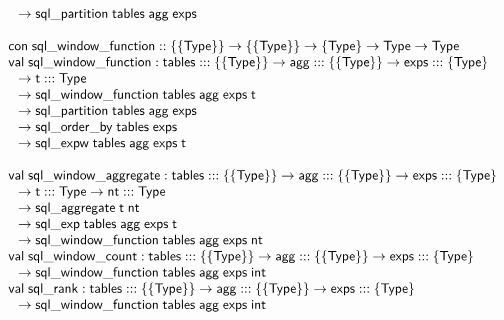 \documentclass{article}
\newcommand{\mt}[1]{\mathsf{#1}}
\begin{document}
$$\begin{array}{l}
  \hspace{.1in} \to \mt{sql\_partition} \; \mt{tables} \; \mt{agg} \; \mt{exps} \\
  \\
  \mt{con} \; \mt{sql\_window\_function} :: \{\{\mt{Type}\}\} \to \{\{\mt{Type}\}\} \to \{\mt{Type}\} \to \mt{Type} \to \mt{Type} \\
  \mt{val} \; \mt{sql\_window\_function} : \mt{tables} ::: \{\{\mt{Type}\}\} \to \mt{agg} ::: \{\{\mt{Type}\}\} \to \mt{exps} ::: \{\mt{Type}\} \\
  \hspace{.1in} \to \mt{t} ::: \mt{Type} \\
  \hspace{.1in} \to \mt{sql\_window\_function} \; \mt{tables} \; \mt{agg} \; \mt{exps} \; \mt{t} \\
  \hspace{.1in} \to \mt{sql\_partition} \; \mt{tables} \; \mt{agg} \; \mt{exps} \\
  \hspace{.1in} \to \mt{sql\_order\_by} \; \mt{tables} \; \mt{exps} \\
  \hspace{.1in} \to \mt{sql\_expw} \; \mt{tables} \; \mt{agg} \; \mt{exps} \; \mt{t} \\
  \\
  \mt{val} \; \mt{sql\_window\_aggregate} : \mt{tables} ::: \{\{\mt{Type}\}\} \to \mt{agg} ::: \{\{\mt{Type}\}\} \to \mt{exps} ::: \{\mt{Type}\} \\
  \hspace{.1in} \to \mt{t} ::: \mt{Type} \to \mt{nt} ::: \mt{Type} \\
  \hspace{.1in} \to \mt{sql\_aggregate} \; \mt{t} \; \mt{nt} \\
  \hspace{.1in} \to \mt{sql\_exp} \; \mt{tables} \; \mt{agg} \; \mt{exps} \; \mt{t} \\
  \hspace{.1in} \to \mt{sql\_window\_function} \; \mt{tables} \; \mt{agg} \; \mt{exps} \; \mt{nt} \\
  \mt{val} \; \mt{sql\_window\_count} : \mt{tables} ::: \{\{\mt{Type}\}\} \to \mt{agg} ::: \{\{\mt{Type}\}\} \to \mt{exps} ::: \{\mt{Type}\} \\
  \hspace{.1in} \to \mt{sql\_window\_function} \; \mt{tables} \; \mt{agg} \; \mt{exps} \; \mt{int} \\
  \mt{val} \; \mt{sql\_rank} : \mt{tables} ::: \{\{\mt{Type}\}\} \to \mt{agg} ::: \{\{\mt{Type}\}\} \to \mt{exps} ::: \{\mt{Type}\} \\
  \hspace{.1in} \to \mt{sql\_window\_function} \; \mt{tables} \; \mt{agg} \; \mt{exps} \; \mt{int}
\end{array}$$
\end{document}
